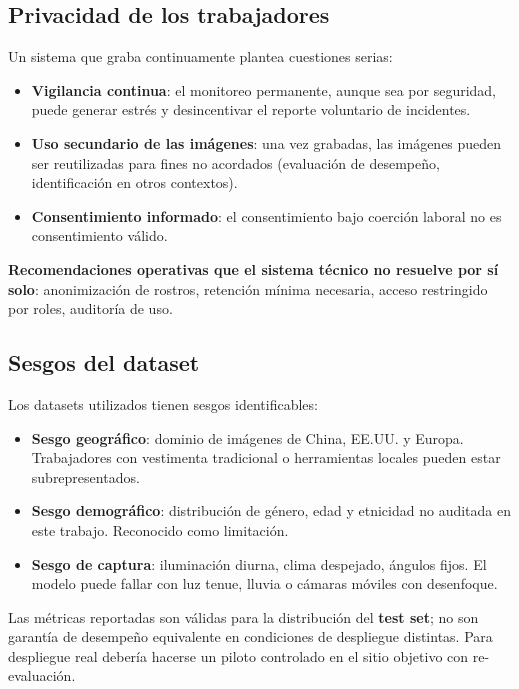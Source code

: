\documentclass[11pt,a4paper]{article}
\begin{document}
\subsection{Privacidad de los trabajadores}

Un sistema que graba continuamente plantea cuestiones serias:

\begin{itemize}[leftmargin=*]
    \item \textbf{Vigilancia continua}: el monitoreo permanente, aunque
    sea por seguridad, puede generar estrés y desincentivar el reporte
    voluntario de incidentes.
    \item \textbf{Uso secundario de las imágenes}: una vez grabadas,
    las imágenes pueden ser reutilizadas para fines no acordados
    (evaluación de desempeño, identificación en otros contextos).
    \item \textbf{Consentimiento informado}: el consentimiento bajo
    coerción laboral no es consentimiento válido.
\end{itemize}

\textbf{Recomendaciones operativas que el sistema técnico no resuelve
por sí solo}: anonimización de rostros, retención mínima necesaria,
acceso restringido por roles, auditoría de uso.

\subsection{Sesgos del dataset}

Los datasets utilizados tienen sesgos identificables:

\begin{itemize}[leftmargin=*]
    \item \textbf{Sesgo geográfico}: dominio de imágenes de China,
    EE.UU. y Europa. Trabajadores con vestimenta tradicional o
    herramientas locales pueden estar subrepresentados.
    \item \textbf{Sesgo demográfico}: distribución de género, edad y
    etnicidad no auditada en este trabajo. Reconocido como limitación.
    \item \textbf{Sesgo de captura}: iluminación diurna, clima
    despejado, ángulos fijos. El modelo puede fallar con luz tenue,
    lluvia o cámaras móviles con desenfoque.
\end{itemize}

Las métricas reportadas son válidas para la distribución del
\textbf{test set}; no son garantía de desempeño equivalente en
condiciones de despliegue distintas. Para despliegue real debería
hacerse un piloto controlado en el sitio objetivo con re-evaluación.
\end{document}
